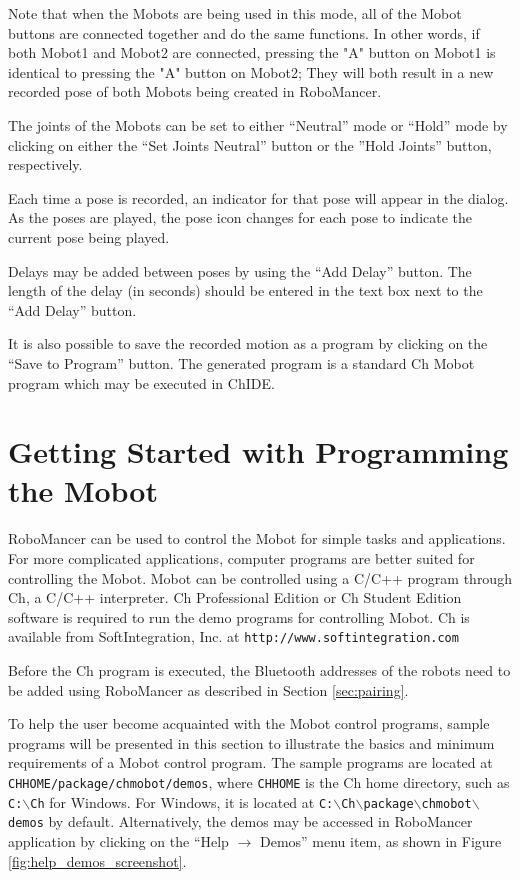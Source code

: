 \documentclass{article}
\begin{document}
Note that when the Mobots are being used in this mode, all of the Mobot buttons are
connected together and do the same functions. In other words, if both Mobot1 and Mobot2 are connected, pressing the "A" button
on Mobot1 is identical to pressing the "A" button on Mobot2; They will both result
in a new recorded pose of both Mobots being created in RoboMancer.

The joints of the Mobots can be set to either ``Neutral'' mode or ``Hold'' mode by clicking
on either the ``Set Joints Neutral'' button or the ''Hold Joints'' button, respectively. 

Each time a pose is recorded, an indicator for that pose will appear in the dialog. As the
poses are played, the pose icon changes for each pose to indicate the current pose being played.

Delays may be added between poses by using the ``Add Delay'' button. The length of the delay (in seconds)
should be entered in the text box next to the ``Add Delay'' button.

It is also possible to save the recorded motion as a program by clicking on the ``Save to Program'' 
button. The generated program is a standard Ch Mobot program which may be executed 
in ChIDE. 

\section{Getting Started with Programming the Mobot}
RoboMancer can be used to control the Mobot for simple tasks and applications.
For more complicated applications, computer programs are better suited for controlling
the Mobot.
Mobot can be controlled using a C/C++ program through Ch, a C/C++ interpreter.
Ch Professional Edition or Ch Student Edition software is required to run the
demo programs for controlling Mobot. Ch is available from SoftIntegration, Inc. at
\texttt{http://www.softintegration.com}

Before the Ch program is executed, the Bluetooth addresses of the robots
need to be added using RoboMancer as described in Section \ref{sec:pairing}.

To help the user become acquainted with the Mobot control programs, sample
programs will be presented in this section to illustrate the basics and minimum requirements of
a Mobot control program. The sample programs are located at
\texttt{CHHOME/package/chmobot/demos}, where \texttt{CHHOME} is the
Ch home directory, such as \texttt{C:$\backslash$Ch} for Windows. For Windows,
it is located at \texttt{C:$\backslash$Ch$\backslash$package$\backslash$chmobot$\backslash$demos} by default.
Alternatively, the demos may be accessed in RoboMancer application
by clicking on the ``Help $\rightarrow$ Demos'' menu item, as shown in Figure
\ref{fig:help_demos_screenshot}.
\end{document}
